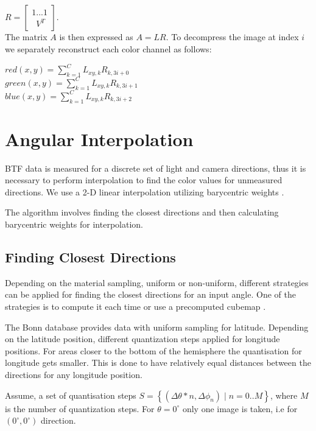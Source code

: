 {\centering $
R=\begin{bmatrix}
 1 ... 1   \\ 
  \, \, \, V^{T}
\end{bmatrix}.$ \\}
  The matrix $A$ is then expressed as $A=LR$. To decompress the image at index $i$ we separately reconstruct each color channel as follows: 


{\centering $red(x,y)=\sum_{k=1}^{C}L_{xy,k}R_{k,3i+0}$ \\}
{\centering $green(x,y)=\sum_{k=1}^{C}L_{xy,k}R_{k,3i+1}$ \\}
{\centering $blue(x,y)=\sum_{k=1}^{C}L_{xy,k}R_{k,3i+2}$ \\}


\section{Angular Interpolation}
\label{chapter:interpolation}


BTF data is measured for a discrete set of light and camera directions, thus it is necessary to perform interpolation to find the color values for unmeasured directions.
We use a 2-D linear interpolation utilizing barycentric weights \cite{haindl_visual}. 

The algorithm involves finding the closest directions and then calculating barycentric weights for interpolation.

\subsection{Finding Closest Directions}
\label{chapter:finding_triangle}
Depending on the material sampling, uniform or non-uniform, different strategies can be applied for finding the closest directions for an input angle.
One of the strategies is to compute it  each time or use a precomputed cubemap \cite{haindl}.

The Bonn database \cite{btfBonn} provides data with uniform sampling for latitude. Depending on the latitude position, different quantization steps applied for longitude positions.
For areas closer to the bottom of the hemisphere the quantisation for longitude gets smaller.
This is done to have relatively equal distances between the directions for any longitude position.


 Assume, a set of quantisation steps $S=\left \{ (\Delta \theta*n , \Delta \phi_n ) \mid n=0..M \right \}$, where $M$ is the number of quantization steps.
For $\theta=0^{\circ}$ only one image is taken, i.e for $(0^{\circ},0^{\circ})$ direction.
  
